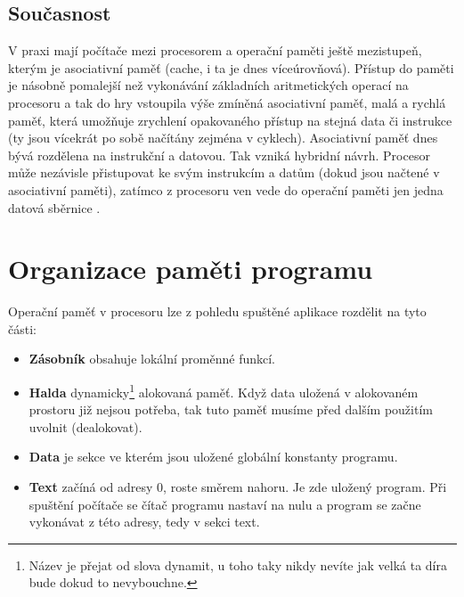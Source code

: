 \documentclass[FM,BP]{tulthesis}
\begin{document}
\subsection{Současnost}
V praxi mají počítače mezi procesorem a operační paměti ještě mezistupeň, kterým je asociativní paměť (cache, i ta je dnes víceúrovňová). Přístup do paměti je násobně pomalejší než vykonávání základních aritmetických operací na procesoru a tak do hry vstoupila výše zmíněná asociativní paměť, malá a rychlá paměť, která umožňuje zrychlení opakovaného přístup na stejná data či instrukce (ty jsou vícekrát po sobě načítány zejména v cyklech). Asociativní paměť dnes bývá rozdělena na instrukční a datovou. Tak vzniká hybridní návrh. Procesor může nezávisle přistupovat ke svým instrukcím a datům (dokud jsou načtené v asociativní paměti), zatímco z procesoru ven vede do operační paměti jen jedna datová sběrnice \cite{wiki_Von_Neumannova_architektura}.

\newpage
\section{Organizace paměti programu} \label{kap:Organizace paměti programu}

Operační paměť v procesoru lze z pohledu spuštěné aplikace rozdělit na tyto části: 
\begin{itemize}
    \item \textbf{Zásobník} obsahuje lokální proměnné funkcí.
    \item \textbf{Halda} dynamicky\footnote{Název je přejat od slova dynamit, u toho taky nikdy nevíte jak velká ta díra bude dokud to nevybouchne.} alokovaná paměť. Když data uložená v alokovaném prostoru již nejsou potřeba, tak tuto paměť musíme před dalším použitím uvolnit (dealokovat).
    \item \textbf{Data} je sekce ve kterém jsou uložené globální konstanty programu.
    \item \textbf{Text} začíná od adresy 0, roste směrem nahoru. Je zde uložený program. Při spuštění počítače se čítač programu nastaví na nulu a program se začne vykonávat z této adresy, tedy v sekci text.
\end{itemize}
\end{document}
